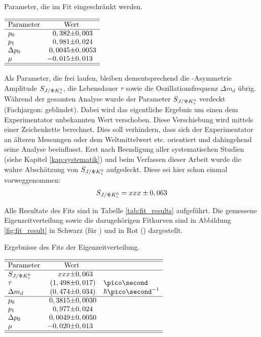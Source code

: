 \begin{table}[hptb]
\centering
\caption{Parameter, die im Fit eingeschränkt werden.}
\label{tab:constrained_parameters}
$\begin{array}{l r@{\pm}l }
\hline 
\hline
\text{Parameter} & \multicolumn{2}{c}{\text{Wert}}\\
\hline
p_0 & 0,382 & 0,003 \\
p_1 & 0,981 & 0,024 \\
\Delta p_0 & 0,0045 & 0,0053 \\
\mu & -0,015 & 0,013 \\ \hline \hline
\end{array}$ 
\end{table}

Als Parameter, die frei laufen, bleiben dementsprechend die \CP-Asymmetrie Amplitude $S_{J/\Psi K_s^0}$, die Lebensdauer $\tau$ sowie die Oszillationsfrequenz $\Delta m_d$ übrig. Während der gesamten Analyse wurde der Parameter $S_{J/\Psi K_s^0}$ verdeckt (Fachjargon: \glqq geblindet\grqq). Dabei wird das eigentliche Ergebnis um einen dem Experimentator unbekannten Wert verschoben. Diese Verschiebung wird mittels einer Zeichenkette berechnet. Dies soll verhindern, dass sich der Experimentator an älteren Messungen oder dem Weltmittelwert etc. orientiert und dahingehend seine Analyse beeinflusst. Erst nach Beendigung aller systematischen Studien (siehe Kapitel \ref{kap:systematik}) und beim Verfassen dieser Arbeit wurde die wahre Abschätzung von $S_{J/\Psi K_s^0}$ aufgedeckt. Diese sei hier schon einmal vorweggenommen:
\begin{align}
S_{J/\Psi K_s^0} = xxx \pm 0,063     \label{eq:fit_result}
\end{align}

Alle Resultate des Fits sind in Tabelle \ref{tab:fit_results} aufgeführt. Die gemessene Eigenzeitverteilung sowie die dazugehörigen Fitkurven sind in Abbildung \ref{fig:fit_result} in Schwarz (für \Bd) und in Rot (\Bdbar) dargestellt.

\begin{table}[hptb]
\centering
\caption{Ergebnisse des Fits der Eigenzeitverteilung.}
\label{tab:fit_results}
$\begin{array}{l r@{\pm}l l}
\hline 
\hline
\text{Parameter} & \multicolumn{2}{c}{\text{Wert}}\\
\hline
\SJPsi & xxx & 0,063 &\\
\tau & (1,498 & 0,017) & \ps\\
\Delta m_d & (0,474 & 0,034) & \hbar\ps^{-1} \\ \hline
p_0 & 0,3815 & 0,0030 & \\
p_1 & 0,977 & 0,024 &\\
\Delta p_0 & 0,0049 & 0,0050 &\\
\mu & -0,020 & 0,013 &\\ \hline \hline
\end{array}$ 
\end{table}

